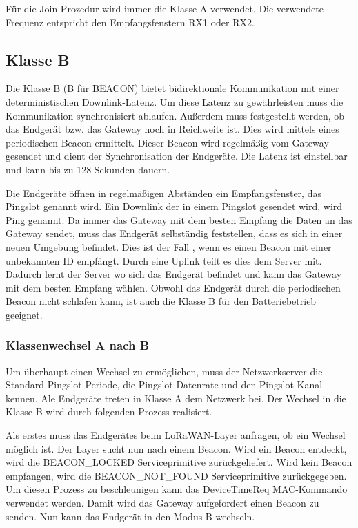 \documentclass[a4paper, 12pt]{article}
\begin{document}
            Für die Join-Prozedur wird immer die Klasse A verwendet. Die verwendete Frequenz entspricht den 
            Empfangsfenstern RX1 oder RX2.
        \subsection{Klasse B}
            Die Klasse B (B für BEACON) bietet bidirektionale Kommunikation mit einer deterministischen Downlink-Latenz.
            Um diese Latenz zu gewährleisten muss die Kommunikation synchronisiert ablaufen. Außerdem muss 
            festgestellt werden, ob das Endgerät bzw. das Gateway noch in Reichweite ist. Dies wird mittels eines 
            periodischen Beacon ermittelt. Dieser Beacon wird regelmäßig vom Gateway gesendet und dient der 
            Synchronisation der Endgeräte. Die Latenz ist einstellbar und kann 
            bis zu 128 Sekunden dauern.\cite[S.66 ff.]{LoRaSpec}

            Die Endgeräte öffnen in regelmäßigen Abständen ein Empfangsfenster, das Pingslot genannt wird. Ein Downlink 
            der in einem Pingslot gesendet wird, wird Ping genannt. Da immer das Gateway mit dem besten Empfang die 
            Daten an das Gateway sendet, muss das Endgerät selbständig feststellen, dass es sich in einer neuen Umgebung befindet.
            Dies ist der Fall , wenn es einen Beacon mit einer unbekannten ID empfängt. Durch eine Uplink teilt es dies 
            dem Server mit. 
            Dadurch lernt der Server wo sich das Endgerät befindet und kann das Gateway mit dem besten Empfang wählen.
            Obwohl das Endgerät durch die periodischen Beacon nicht schlafen kann, ist auch die Klasse B für den 
            Batteriebetrieb geeignet.

            \subsubsection{Klassenwechsel A nach B}
                Um überhaupt einen Wechsel zu ermöglichen, muss der Netzwerkserver die Standard Pingslot Periode, die 
                Pingslot Datenrate und den Pingslot Kanal kennen. Ale Endgeräte treten in Klasse A dem Netzwerk bei. 
                Der Wechsel in die Klasse B wird durch folgenden Prozess realisiert.

                Als erstes muss das Endgerätes beim LoRaWAN-Layer anfragen, ob ein Wechsel möglich ist. 
                Der Layer sucht nun nach einem Beacon. Wird ein Beacon entdeckt, wird die BEACON\_LOCKED 
                Serviceprimitive 
                zurückgeliefert. Wird kein Beacon empfangen, wird die BEACON\_NOT\_FOUND Serviceprimitive 
                zurückgegeben. Um diesen Prozess zu beschleunigen kann das DeviceTimeReq 
                MAC-Kommando verwendet werden. Damit wird das Gateway aufgefordert einen Beacon zu senden. Nun kann 
                das Endgerät in den Modus B wechseln.
\end{document}
